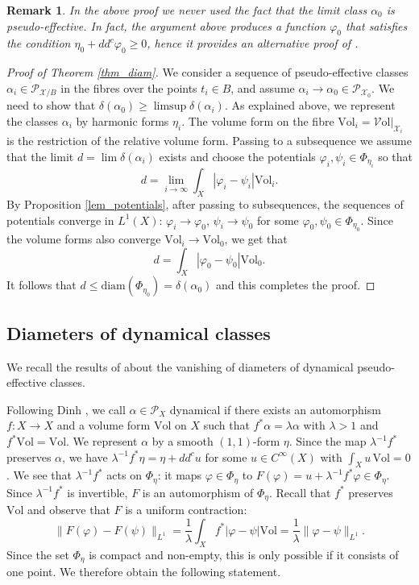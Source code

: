 \documentclass[11pt]{article}
\newcommand{\6}{\partial}
\newcommand{\PP}{\mathcal{P}}
\newcommand{\XX}{\mathcal{X}}
\renewcommand{\ge}{\geqslant}
\renewcommand{\le}{\leqslant}
\newcommand{\Vol}{\mathrm{Vol}}
\newcommand{\VVol}{\mathcal{V}\mathrm{ol}}
\newtheorem{rem}[defn]{Remark}
\begin{document}
\begin{rem}
In the above proof we never used the fact that the limit class $\alpha_0$ is pseudo-effective.
In fact, the argument above produces a function $\varphi_0$ that satisfies the
condition $\eta_0+dd^c\varphi_0\ge 0$, hence it provides an alternative proof
of \cite[Theorem A.1]{AHD}.
\end{rem}

\begin{proof}[Proof of Theorem \ref{thm_diam}]
We consider a sequence of pseudo-effective classes $\alpha_i\in\PP_{\XX/B}$ in the fibres
over the points $t_i\in B$, and assume $\alpha_i\to \alpha_0\in\PP_{\XX_0}$.
We need to show that $\delta(\alpha_0)\ge \limsup \delta(\alpha_i)$.
As explained above, we represent the classes $\alpha_i$ by harmonic forms $\eta_i$.
The volume form on the fibre $\Vol_i = \VVol|_{\XX_i}$ is the restriction of the relative volume form.
Passing to a subsequence we assume that the limit $d = \lim \delta(\alpha_i)$
exists and choose the potentials $\varphi_i,\psi_i\in \Phi_{\eta_i}$ so
that
$$
d = \lim_{i\to\infty}\int_X|\varphi_i-\psi_i|\Vol_i.
$$
By Proposition \ref{lem_potentials}, after passing to subsequences, the sequences of potentials converge in $L^1(X)$:
$\varphi_i\to \varphi_0$, $\psi_i\to \psi_0$ for some $\varphi_0,\psi_0\in\Phi_{\eta_0}$.
Since the volume forms also converge $\Vol_i\to \Vol_0$, we get that
$$
d = \int_X|\varphi_0-\psi_0|\Vol_0.
$$
It follows that $d\le \mathrm{diam}(\Phi_{\eta_0})=\delta(\alpha_0)$ and this completes the proof.
\end{proof}

\subsection{Diameters of dynamical classes}\label{sec_dynam}
We recall the results of \cite{_Cantat:K3_} about
the vanishing of diameters of dynamical pseudo-effective classes.

Following Dinh \cite{Di}, we call $\alpha\in \PP_X$ dynamical if there exists an automorphism $f\colon X\to X$
and a volume form $\Vol$ on $X$ such that $f^*\alpha =\lambda \alpha$ with $\lambda > 1$
and $f^*\Vol = \Vol$. We represent $\alpha$
by a smooth $(1,1)$-form $\eta$. Since the map $\lambda^{-1}f^*$ preserves $\alpha$,
we have $\lambda^{-1}f^*\eta = \eta+dd^c u$ for some $u\in C^{\infty}(X)$ with $\int_X u\,\Vol = 0$.
We see that $\lambda^{-1}f^*$ acts on $\Phi_\eta$:
it maps $\varphi\in \Phi_\eta$ to $F(\varphi) = u + \lambda^{-1}f^*\varphi \in \Phi_\eta$.
Since $\lambda^{-1}f^*$ is invertible, $F$ is an automorphism of $\Phi_\eta$.
Recall that $f^*$ preserves $\Vol$ and observe that $F$ is a uniform contraction:
$$
\|F(\varphi)-F(\psi)\|_{L^1} = \frac{1}{\lambda}\int_X f^*|\varphi-\psi|\Vol = \frac{1}{\lambda}\|\varphi-\psi\|_{L^1}.
$$
Since the set $\Phi_\eta$ is compact and non-empty, this is only possible if it consists of one point.
We therefore obtain the following statement.
\end{document}
